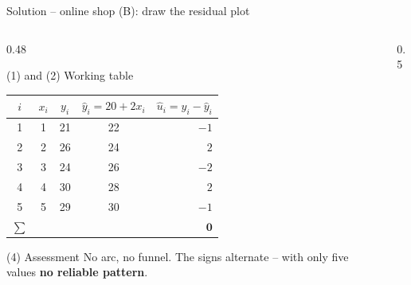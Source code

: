 \documentclass[aspectratio=169,11pt]{beamer}
\def\shopreslist{22/-1,24/2,26/-2,28/2,30/-1}
\newcommand{\residualplotof}[1]{%
  \foreach \px/\py in #1 {%
    \edef\tmpdraw{\noexpand\draw[hsbirot!70, line width=1.2pt] (axis cs:\px,0) -- (axis cs:\px,\py);
      \noexpand\fill[hsbiblau] (axis cs:\px,\py) circle[radius=2.2pt];}%
    \tmpdraw
  }}
\begin{document}
\begin{frame}{Solution -- online shop (B): draw the residual plot}
  \begin{columns}[T]
    \begin{column}{0.48\textwidth}
      \small
      \begin{block}{(1) and (2) Working table}
        \begin{center}
          \renewcommand{\arraystretch}{0.95}
          \begin{tabular}{c|cc|c|r}
            \toprule
            $i$ & $x_i$ & $y_i$ & $\hat{y}_i = 20 + 2x_i$ & $\hat{u}_i = y_i - \hat{y}_i$ \\
            \midrule
            1 & 1 & 21 & 22 & $-1$ \\
            2 & 2 & 26 & 24 & $2$  \\
            3 & 3 & 24 & 26 & $-2$ \\
            4 & 4 & 30 & 28 & $2$  \\
            5 & 5 & 29 & 30 & $-1$ \\
            \midrule
            $\sum$ & & & & $\mathbf{0}$ \\
            \bottomrule
          \end{tabular}
        \end{center}
      \end{block}
      \begin{exampleblock}{(4) Assessment}
        No arc, no funnel. The signs alternate -- with only five values
        \textbf{no reliable pattern}.
      \end{exampleblock}
    \end{column}
    \begin{column}{0.5\textwidth}
    \end{column}
  \end{columns}
\end{frame}
\end{document}
